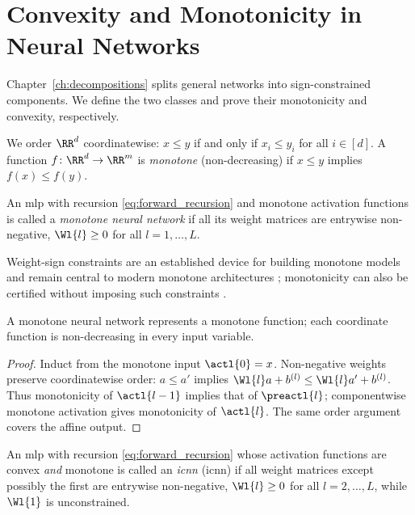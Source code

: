 \section{Convexity and Monotonicity in Neural Networks}\label{sec:convex_monotone_foundations}

Chapter~\ref{ch:decompositions} splits general networks into sign-constrained components. We define the two classes and prove their monotonicity and convexity, respectively.

We order $\RR^d$ coordinatewise: $x \le y$ if and only if $x_i \le y_i$ for all $i \in [d]$. A function $f \colon \RR^d \to \RR^m$ is \emph{monotone} (non-decreasing) if $x \le y$ implies $f(x) \le f(y)$.

\begin{definition}\label{def:monotone_network}
An \ac{mlp} with recursion \eqref{eq:forward_recursion} and monotone activation functions is called a \emph{monotone neural network} if all its weight matrices are entrywise non-negative, $\Wl{l} \ge 0$ for all $l = 1, \ldots, L$.
\end{definition}

Weight-sign constraints are an established device for building monotone models \parencite{Sill1997_MonotonicNetworks,Daniels2010_MonotoneNN} and remain central to modern monotone architectures \parencite{Runje_2023}; monotonicity can also be certified without imposing such constraints \parencite{Liu2020CertifiedMonotone}.

\begin{proposition}\label{prop:monotone_represents}
A monotone neural network represents a monotone function; each coordinate function is non-decreasing in every input variable.\end{proposition}

\begin{proof}
Induct from the monotone input $\actl{0}=x$. Non-negative weights preserve coordinatewise order: $a\le a'$ implies $\Wl{l}a+b^{(l)}\le\Wl{l}a'+b^{(l)}$. Thus monotonicity of $\actl{l-1}$ implies that of $\preactl{l}$; componentwise monotone activation gives monotonicity of $\actl{l}$. The same order argument covers the affine output.
\end{proof}

\begin{definition}\label{def:icnn}
An \ac{mlp} with recursion \eqref{eq:forward_recursion} whose activation functions are convex \emph{and} monotone is called an \emph{\acl{icnn}} (\acs{icnn}) if all weight matrices except possibly the first are entrywise non-negative, $\Wl{l} \ge 0$ for all $l = 2, \ldots, L$, while $\Wl{1}$ is unconstrained.
\end{definition}

